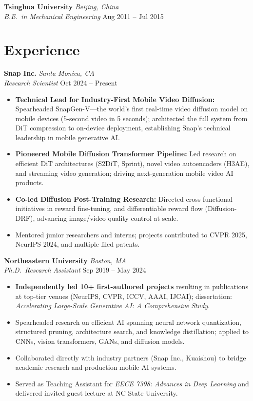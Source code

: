 \documentclass[11pt,letterpaper]{article}
\newcommand{\cventry}[4]{%
    \noindent\textbf{#1} \hfill \textit{#2} \\
    \textit{#3} \hfill #4 \\[4pt]
}
\begin{document}
\cventry{Tsinghua University}{Beijing, China}{B.E.\ in Mechanical Engineering}{Aug 2011 -- Jul 2015}

\section{Experience}

\cventry{Snap Inc.}{Santa Monica, CA}{Research Scientist}{Oct 2024 -- Present}
\begin{itemize}
    \item \textbf{Technical Lead for Industry-First Mobile Video Diffusion:} Spearheaded SnapGen-V---the world's first real-time video diffusion model on mobile devices (5-second video in 5 seconds); architected the full system from DiT compression to on-device deployment, establishing Snap's technical leadership in mobile generative AI.
    \item \textbf{Pioneered Mobile Diffusion Transformer Pipeline:} Led research on efficient DiT architectures (S2DiT, Sprint), novel video autoencoders (H3AE), and streaming video generation; driving next-generation mobile video AI products.
    \item \textbf{Co-led Diffusion Post-Training Research:} Directed cross-functional initiatives in reward fine-tuning, and differentiable reward flow (Diffusion-DRF), advancing image/video quality control at scale.
    \item Mentored junior researchers and interns; projects contributed to CVPR 2025, NeurIPS 2024, and multiple filed patents.
\end{itemize}

\cventry{Northeastern University}{Boston, MA}{Ph.D.\ Research Assistant}{Sep 2019 -- May 2024}
\begin{itemize}
    \item \textbf{Independently led 10+ first-authored projects} resulting in publications at top-tier venues (NeurIPS, CVPR, ICCV, AAAI, IJCAI); dissertation: \textit{Accelerating Large-Scale Generative AI: A Comprehensive Study}.
    \item Spearheaded research on efficient AI spanning neural network quantization, structured pruning, architecture search, and knowledge distillation; applied to CNNs, vision transformers, GANs, and diffusion models.
    \item Collaborated directly with industry partners (Snap Inc., Kuaishou) to bridge academic research and production mobile AI systems.
    \item Served as Teaching Assistant for \textit{EECE 7398: Advances in Deep Learning} and delivered invited guest lecture at NC State University.
\end{itemize}
\end{document}
